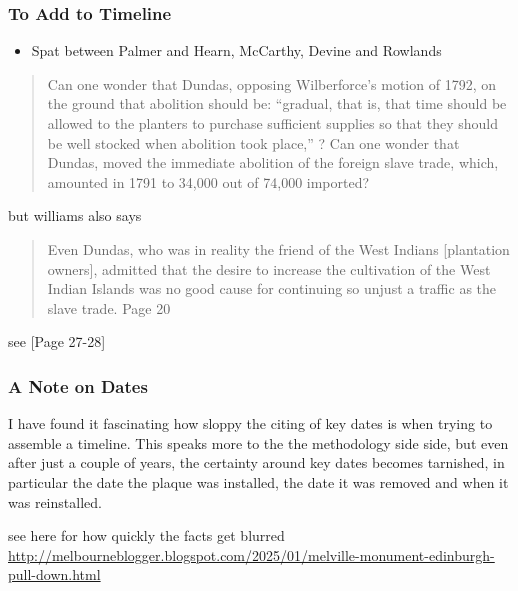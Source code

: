 \documentclass{scrartcl}
\begin{document}
\subsubsection{To Add to Timeline}

\begin{itemize}
    \item Spat between Palmer and  Hearn, McCarthy, Devine and Rowlands
\end{itemize}

\begin{quotation}
    Can one wonder that Dundas, 
            opposing Wilberforce’s motion of 1792, 
                    on the ground that abolition should be: 
                    “gradual, that is, that time should be allowed to the planters to purchase sufficient supplies so that they should be well stocked when abolition took place,'' ?
    Can one wonder that Dundas, 
    moved the immediate abolition of the foreign slave trade, 
     which, 
    amounted in 1791 to 34,000 out of 74,000 imported?
\end{quotation}
\cite{williams_1938}

but williams also says

\begin{quotation}
    Even Dundas, who was in reality the friend of the West Indians [plantation owners], admitted that the desire to increase the cultivation of the West Indian Islands was no good cause for continuing so unjust a traffic as the slave trade. Page 20
\end{quotation} 
see \cite{williams_1938}[Page 27-28]

\subsubsection{A Note on Dates}

I have found it fascinating how sloppy the citing of key dates is when trying to assemble a timeline. This speaks more to the the methodology side side, but even after just a couple of years, the certainty around  key dates becomes tarnished, in particular the date the plaque was installed, the date it was removed and when it was reinstalled.

see here for how quickly the facts get blurred \url{http://melbourneblogger.blogspot.com/2025/01/melville-monument-edinburgh-pull-down.html}
\end{document}
